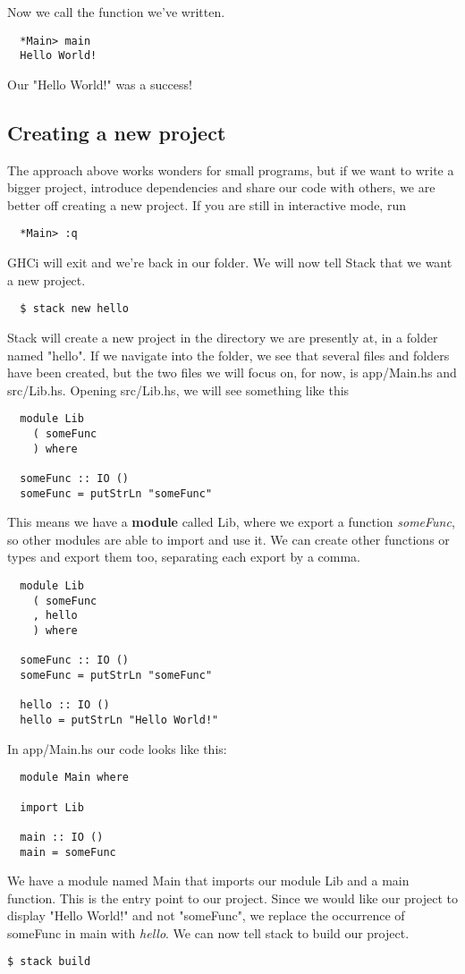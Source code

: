 \documentclass{article}
\begin{document}
Now we call the function we've written.

\begin{lstlisting}
  *Main> main
  Hello World!
\end{lstlisting}

Our "Hello World!" was a success!

\subsection{Creating a new project}
The approach above works wonders for small programs, but if we want to write a bigger project, introduce dependencies and share our code with others, we are better off creating a new project. If you are still in interactive mode, run
\begin{lstlisting}
  *Main> :q
\end{lstlisting}
GHCi will exit and we're back in our folder. We will now tell Stack that we want a new project.
\begin{lstlisting}
  $ stack new hello
\end{lstlisting}

Stack will create a new project in the directory we are presently at, in a folder named "hello". If we navigate into the folder, we see that several files and folders have been created, but the two files we will focus on, for now, is app/Main.hs and src/Lib.hs. Opening src/Lib.hs, we will see something like this

\begin{lstlisting}
  module Lib 
    ( someFunc
    ) where

  someFunc :: IO ()
  someFunc = putStrLn "someFunc"
\end{lstlisting}

This means we have a \textbf{module} called Lib, where we export a function \textit{someFunc}, so other modules are able to import and use it. We can create other functions or types and export them too, separating each export by a comma.

\begin{lstlisting}
  module Lib 
    ( someFunc
    , hello
    ) where
    
  someFunc :: IO ()
  someFunc = putStrLn "someFunc"
    
  hello :: IO ()
  hello = putStrLn "Hello World!"
\end{lstlisting}

In app/Main.hs our code looks like this:

\begin{lstlisting}
  module Main where

  import Lib 

  main :: IO ()
  main = someFunc
\end{lstlisting}
We have a module named Main that imports our module Lib and a main function. This is the entry point to our project. Since we would like our project to display "Hello World!" and not "someFunc", we replace the occurrence of someFunc in main with \textit{hello}. We can now tell stack to build our project.
\begin{lstlisting}[language=bash]
  $ stack build
\end{lstlisting}
\end{document}
